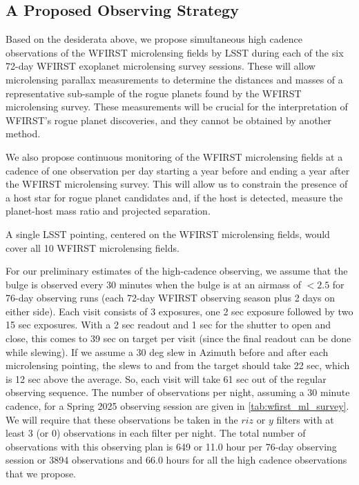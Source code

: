 
\subsection{A Proposed Observing Strategy}
\label{sec:\secname:proposal}

Based on the desiderata above, we
propose simultaneous high cadence observations of the WFIRST microlensing fields 
by LSST during each
of the six 72-day WFIRST exoplanet microlensing survey sessions. These
will allow microlensing parallax measurements to determine the distances
and masses of a representative sub-sample of the rogue planets found by
the WFIRST microlensing survey. These measurements will be crucial for
the interpretation of WFIRST's rogue planet discoveries, and they
cannot be obtained by another method.

We also propose continuous monitoring of the WFIRST microlensing fields
at a cadence of one observation per day
starting a year before and ending a year after the WFIRST microlensing survey. 
This will allow us to constrain the presence of a host star for rogue planet candidates and, 
if the host is detected, measure the planet-host mass ratio and projected separation. 

A single LSST pointing, centered on the WFIRST microlensing
fields, would cover all 10 WFIRST microlensing fields.

For our preliminary estimates of the high-cadence observing, we assume
that the bulge is observed every 30 minutes when the bulge is at
an airmass of $< 2.5$ for 76-day observing runs (each 72-day WFIRST observing
season plus 2 days on either side). Each visit consists of 3 exposures,
one 2 sec exposure followed by two 15 sec exposures. With a 2 sec readout
and 1 sec for the shutter to open and close, this comes to 39 sec on target
per visit (since the final readout can be done while slewing).
If we assume a 30 deg slew in Azimuth before and after each microlensing pointing, the slews
to and from the target should take 22 sec, which is 12 sec above the average. So,
each visit will take 61 sec out of the regular observing sequence.
The number of observations per night, assuming a 30 minute cadence, for
a Spring 2025 observing session are given in \autoref{tab:wfirst_ml_survey}. We will require
that these observations be taken in the $riz$ or $y$ filters with at
least 3 (or 0) observations in each filter per night. The total number
of observations with this observing plan is 649 or 11.0 hour per
76-day observing session or 3894 observations and 66.0 hours for
all the high cadence observations that we propose.

